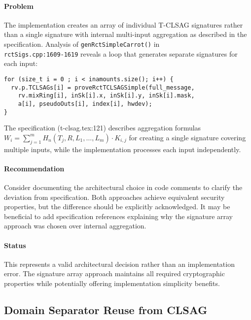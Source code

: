 \documentclass{article}
\begin{document}
\paragraph{Problem}
The implementation creates an array of individual T-CLSAG signatures rather 
than a single signature with internal multi-input aggregation as described 
in the specification.  Analysis of \texttt{genRctSimpleCarrot()} in \\
\texttt{rctSigs.cpp:1609-1619} reveals a loop that generates separate 
signatures for each input:
\begin{verbatim}
for (size_t i = 0 ; i < inamounts.size(); i++) {
  rv.p.TCLSAGs[i] = proveRctTCLSAGSimple(full_message, 
    rv.mixRing[i], inSk[i].x, inSk[i].y, inSk[i].mask, 
    a[i], pseudoOuts[i], index[i], hwdev);
}
\end{verbatim}
The specification (t-clsag.tex:121) describes aggregation formulas 
$W_i = \sum_{j=1}^{m} H_n(T_j, R, L_1, \ldots, L_m) \cdot K_{i,j}$ for 
creating a single signature covering multiple inputs, while the implementation 
processes each input independently.

\paragraph{Recommendation}
Consider documenting the architectural choice in code comments to clarify 
the deviation from specification.  Both approaches achieve equivalent security 
properties, but the difference should be explicitly acknowledged.  It may be 
beneficial to add specification references explaining why the signature array 
approach was chosen over internal aggregation.

\paragraph{Status}
This represents a valid architectural decision rather than an implementation 
error.  The signature array approach maintains all required cryptographic 
properties while potentially offering implementation simplicity benefits.

\subsection{Domain Separator Reuse from CLSAG}
\end{document}
